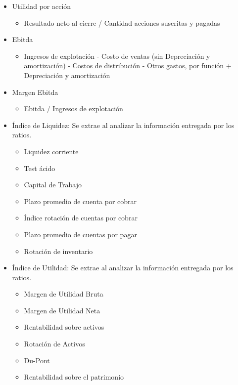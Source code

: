 {\begin{itemize}
	 \item Utilidad por acción
	  \begin{itemize}
	   \item Resultado neto al cierre / Cantidad acciones suscritas y pagadas
	  \end{itemize}
	 \item Ebitda
	  \begin{itemize}
	   \item Ingresos de explotación - Costo de ventas (sin Depreciación y amortización) - Costos de distribución - Otros gastos, por función + Depreciación y amortización
	  \end{itemize}
	 \item Margen Ebitda
	  \begin{itemize}
	   \item Ebitda / Ingresos de explotación
	  \end{itemize}
	 \end{itemize}
	 
	\vspace{3mm}
	
	
	\begin{itemize}
	\item Índice de Liquidez: Se extrae al analizar la información entregada por los ratios.
	  \begin{itemize}
	  \item Liquidez corriente
	  \item Test ácido
	  \item Capital de Trabajo
	  \item Plazo promedio de cuenta por cobrar
	  \item Índice rotación de cuentas por cobrar
	  \item Plazo promedio de cuentas por pagar
	  \item Rotación de inventario
	  \end{itemize}
	\end{itemize}
	
	\begin{itemize}
	\item Índice de Utilidad: Se extrae al analizar la información entregada por los ratios.
	  \begin{itemize}
	  \item Margen de Utilidad Bruta
	  \item Margen de Utilidad Neta
	  \item Rentabilidad sobre activos
	  \item Rotación de Activos
	  \item Du-Pont
	  \item Rentabilidad sobre el patrimonio
	  \end{itemize}
	\end{itemize}
	
}
